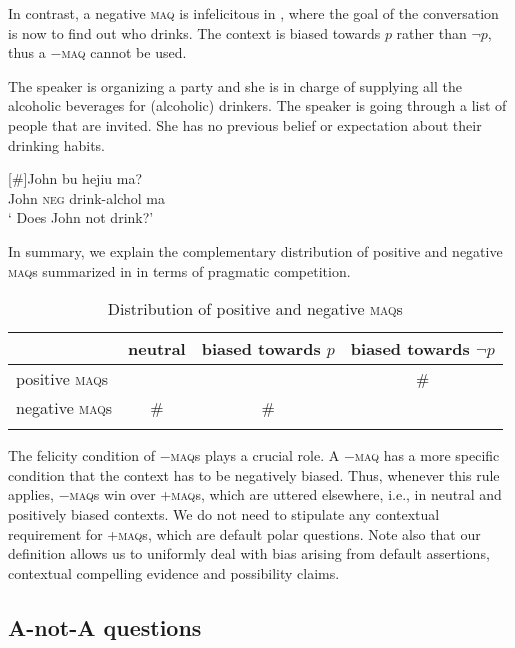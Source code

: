 \documentclass[output=paper,colorlinks,citecolor=brown]{langscibook}
\begin{document}
In contrast, a negative \textsc{maq} is infelicitous in , where the goal of the conversation is now to find out who drinks.  The context is biased towards $p$ rather than $\neg p$, thus a $-$\textsc{maq} cannot be used.


\ea \label{posd}The speaker is organizing a party and she is in charge
of supplying all the alcoholic beverages for (alcoholic) drinkers.
The speaker is going through a list of people that are invited.
She has no previous belief or expectation about their drinking
habits.
\begin{xlist}
[\#]{\gll John bu hejiu ma?\\
John \textsc{neg} drink-alchol ma\\
\glt ` Does John not drink?' }
\end{xlist}
\z
 
 
 
 
In summary, we explain the complementary distribution of positive and negative  \textsc{maq}s summarized in  in terms of pragmatic competition.

\begin{table}
\begin{tabularx}{\textwidth}{lCCc}
\lsptoprule
	&  neutral  & biased towards  $p$ & biased towards $\neg p$\\
\midrule
	positive \textsc{maq}s & \cmark & \cmark & \#\\
	negative \textsc{maq}s & \# & \# & \cmark\\
\lspbottomrule
\end{tabularx}
\caption{Distribution of positive and negative \textsc{maq}s}
\label{maqs}
\end{table}

The felicity condition of $-$\textsc{maq}s  plays a crucial role. A $-$\textsc{maq} has a more specific condition that the context has to be negatively biased.  Thus, whenever this rule applies,   $-$\textsc{maq}s win over +\textsc{maq}s, which are uttered elsewhere, i.e., in neutral and positively biased contexts.   We do not need to stipulate any contextual requirement for +\textsc{maq}s, which are default polar questions. Note also that our definition allows us to uniformly deal with  bias arising from default assertions, contextual compelling evidence and possibility claims.

\subsection{A-not-A questions}
\end{document}
